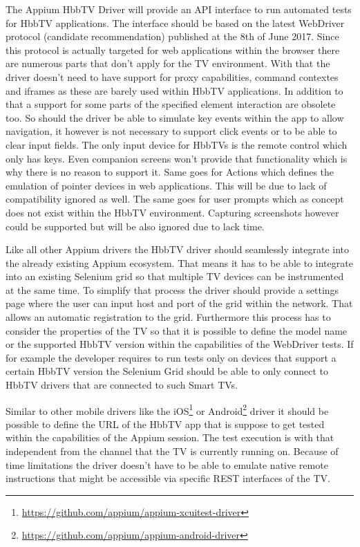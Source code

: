 The Appium HbbTV Driver will provide an API interface to run automated tests for HbbTV
applications. The interface should be based on the latest WebDriver protocol (candidate
recommendation) published at the 8th of June 2017. Since this protocol is actually targeted
for web applications within the browser there are numerous parts that don't apply for the
TV environment. With that the driver doesn't need to have support for proxy capabilities,
command contextes and iframes as these are barely used within HbbTV applications. In addition
to that a support for some parts of the specified element interaction are obsolete too. So
should the driver be able to simulate key events within the app to allow navigation, it
however is not necessary to support click events or to be able to clear input fields. The
only input device for HbbTVs is the remote control which only has keys. Even companion screens
won't provide that functionality which is why there is no reason to support it. Same goes
for Actions which defines the emulation of pointer devices in web applications. This will
be due to lack of compatibility ignored as well. The same goes for user prompts which as
concept does not exist within the HbbTV environment. Capturing screenshots however could
be supported but will be also ignored due to lack time.

Like all other Appium drivers the HbbTV driver should seamlessly integrate into the already
existing Appium ecosystem. That means it has to be able to integrate into an existing
Selenium grid so that multiple TV devices can be instrumented at the same time. To simplify
that process the driver should provide a settings page where the user can input host and port
of the grid within the network. That allows an automatic registration to the grid. Furthermore
this process has to consider the properties of the TV so that it is possible to define the
model name or the supported HbbTV version within the capabilities of the WebDriver tests.
If for example the developer requires to run tests only on devices that support a certain
HbbTV version the Selenium Grid should be able to only connect to HbbTV drivers that are
connected to such Smart TVs.

Similar to other mobile drivers like the iOS\footnote{\url{https://github.com/appium/appium-xcuitest-driver}}
or Android\footnote{\url{https://github.com/appium/appium-android-driver}} driver it should
be possible to define the URL of the HbbTV app that is suppose to get tested within the
capabilities of the Appium session. The test execution is with that independent from the
channel that the TV is currently running on. Because of time limitations the driver doesn't
have to be able to emulate native remote instructions that might be accessible via specific
REST interfaces of the TV.

